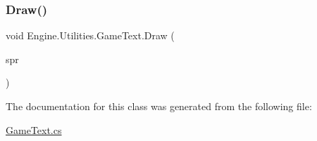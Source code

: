 \subsubsection{\texorpdfstring{Draw()}{Draw()}}
{\footnotesize\ttfamily void Engine.\+Utilities.\+Game\+Text.\+Draw (\begin{DoxyParamCaption}\item[{Sprite\+Batch}]{spr }\end{DoxyParamCaption})\hspace{0.3cm}{\ttfamily [inline]}}



The documentation for this class was generated from the following file\+:\begin{DoxyCompactItemize}
\item 
\hyperlink{a00230}{Game\+Text.\+cs}\end{DoxyCompactItemize}
